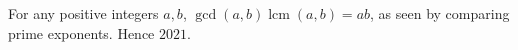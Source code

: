 For any positive integers $a,b$, $\gcd(a,b)\operatorname{lcm}(a,b)=ab$, as seen by comparing prime exponents. Hence $\boxed{2021}$.
